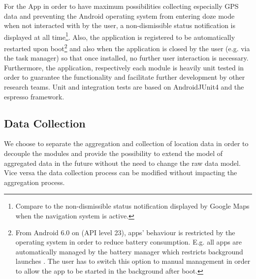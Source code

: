 For the App in order to have maximum possibilities collecting especially GPS data and preventing the Android operating system from entering doze mode when not interacted with by the user, a non-dismissible status notification is displayed at all time\footnote{Compare to the non-dismissible status notification displayed by Google Maps when the navigation system is active.}. Also, the application is registered to be automatically restarted upon boot\footnote{From Android 6.0 on (API level 23), apps' behaviour is restricted by the operating system in order to reduce battery consumption. E.g. all apps are automatically managed by the battery manager which restricts background launches \parencite{background, doze}. The user has to switch this option to manual management in order to allow the app to be started in the background after boot.} and also when the application is closed by the user (e.g. via the task manager) so that once installed, no further user interaction is necessary.
Furthermore, the application, respectively each module is heavily unit tested in order to guarantee the functionality and facilitate further development by other research teams. Unit and integration tests are based on AndroidJUnit4 \parencite{androidJunit4} and the espresso \parencite{espresso} framework.


\subsection {Data Collection}
We choose to separate the aggregation and collection of location data in order to decouple the modules and provide the possibility to extend the model of aggregated data in the future without the need to change the raw data model. Vice versa the data collection process can be modified without impacting the aggregation process.\\

